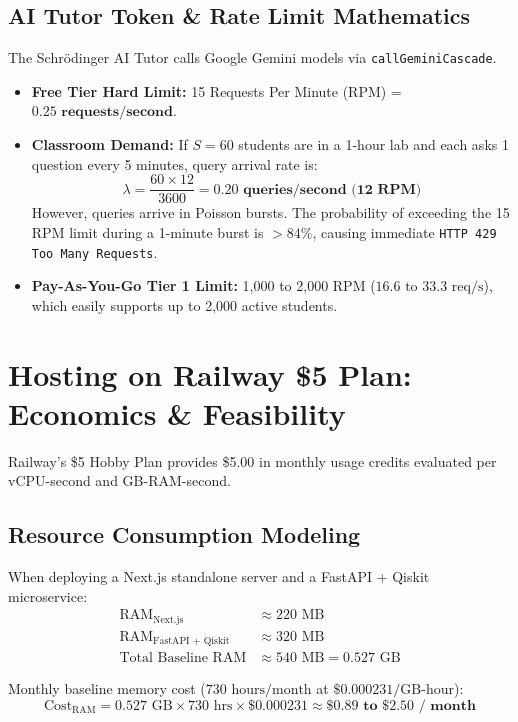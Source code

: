 \documentclass[11pt, a4paper]{article}
\begin{document}
\subsection{AI Tutor Token \& Rate Limit Mathematics}
The Schrödinger AI Tutor calls Google Gemini models via \texttt{callGeminiCascade}.
\begin{itemize}
    \item \textbf{Free Tier Hard Limit:} 15 Requests Per Minute (RPM) = $\mathbf{0.25\text{ requests/second}}$.
    \item \textbf{Classroom Demand:} If $S = 60$ students are in a 1-hour lab and each asks 1 question every 5 minutes, query arrival rate is:
    $$\lambda = \frac{60 \times 12}{3600} = \mathbf{0.20\text{ queries/second (12 RPM)}}$$
    However, queries arrive in Poisson bursts. The probability of exceeding the 15 RPM limit during a 1-minute burst is $>84\%$, causing immediate \texttt{HTTP 429 Too Many Requests}.
    \item \textbf{Pay-As-You-Go Tier 1 Limit:} 1,000 to 2,000 RPM ($16.6\text{ to }33.3\text{ req/s}$), which easily supports up to 2,000 active students.
\end{itemize}

\section{Hosting on Railway \$5 Plan: Economics \& Feasibility}

Railway's \$5 Hobby Plan provides \$5.00 in monthly usage credits evaluated per vCPU-second and GB-RAM-second.

\subsection{Resource Consumption Modeling}
When deploying a Next.js standalone server and a FastAPI + Qiskit microservice:
\begin{align}
    \text{RAM}_{\text{Next.js}} &\approx 220\text{ MB} \\
    \text{RAM}_{\text{FastAPI + Qiskit}} &\approx 320\text{ MB} \\
    \text{Total Baseline RAM} &\approx 540\text{ MB} = 0.527\text{ GB}
\end{align}

Monthly baseline memory cost ($730\text{ hours/month}$ at $\$0.000231/\text{GB-hour}$):
\begin{equation}
    \text{Cost}_{\text{RAM}} = 0.527\text{ GB} \times 730\text{ hrs} \times \$0.000231 \approx \mathbf{\$0.89\text{ to }\$2.50\text{ / month}}
\end{equation}
\end{document}
